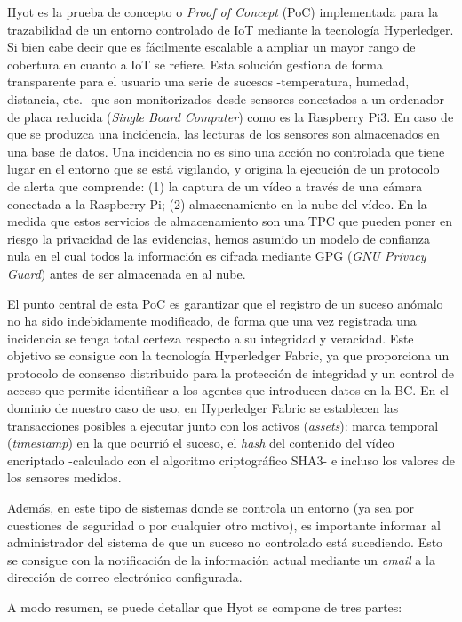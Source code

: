 \documentclass[10pt,conference,a4paper]{IEEEtran}
\begin{document}
Hyot es la prueba de concepto o \textit{Proof of Concept} (PoC)
implementada para la trazabilidad de un entorno controlado de IoT
mediante la tecnología Hyperledger. Si bien cabe decir que es
fácilmente escalable a ampliar un mayor rango de cobertura en cuanto a
IoT se refiere. Esta solución gestiona de forma transparente para el
usuario una serie de sucesos -temperatura, humedad, distancia, etc.-
que son monitorizados desde sensores conectados a un ordenador de
placa reducida (\textit{Single Board Computer}) como es la Raspberry
Pi3. En caso de que se produzca una incidencia, las lecturas de los
sensores son almacenados en una base de datos. Una incidencia no es
sino una acción no controlada que tiene lugar en el entorno que se
está vigilando, y origina la ejecución de un protocolo de alerta que
comprende: (1) la captura de un vídeo a través de una cámara conectada
a la Raspberry Pi; (2) almacenamiento en la nube del vídeo. En la
medida que estos servicios de almacenamiento son una TPC que pueden
poner en riesgo la privacidad de las evidencias, hemos asumido un
modelo de confianza nula en el cual todos la información es cifrada
mediante  GPG (\textit{GNU Privacy Guard}) antes de ser almacenada en
al nube.

El punto central de esta PoC es garantizar que el
registro de un  suceso anómalo no ha sido indebidamente
modificado, de forma que una vez registrada una incidencia se tenga
total certeza respecto a su integridad y veracidad. Este objetivo se
consigue con la tecnología Hyperledger Fabric, ya que proporciona un
protocolo de consenso distribuido para la protección de integridad y
un control de acceso que permite identificar a los agentes que
introducen datos en la BC. En el dominio de nuestro caso de uso, en Hyperledger
Fabric se establecen las transacciones posibles a ejecutar junto con
los activos (\textit{assets}): marca temporal (\textit{timestamp}) en
la que ocurrió el suceso, el \textit{hash} del contenido del vídeo
encriptado -calculado con el algoritmo criptográfico SHA3- e incluso
los valores de los sensores medidos.

Además, en este tipo de sistemas donde se controla un entorno (ya sea
por cuestiones de seguridad o por cualquier otro motivo), es importante
informar al administrador del sistema de que un suceso no
controlado está sucediendo. Esto se consigue con la notificación de la
información actual mediante un \textit{email} a la dirección de correo
electrónico configurada.

A modo resumen, se puede detallar que Hyot se compone de tres partes:
\end{document}
